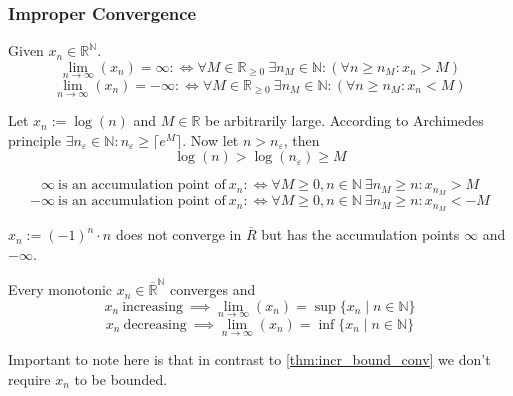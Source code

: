 \subsubsection{Improper Convergence}
\begin{definition}
   Given \(x_n \in \mathbb{R}^\mathbb{N}\).
   \[\lim_{n \to \infty}(x_n) = \infty :\iff \forall M \in \mathbb{R}_{\geq 0}~\exists n_M \in \mathbb{N}: (\forall n \geq n_M: x_n > M)\]
   \[\lim_{n \to \infty}(x_n) = -\infty :\iff \forall M \in \mathbb{R}_{\geq 0}~\exists n_M \in \mathbb{N}: (\forall n \geq n_M: x_n < M)\]
\end{definition}
\begin{example}
   Let \(x_n := \log(n)\) and \(M \in \mathbb{R}\) be arbitrarily large.
   According to Archimedes principle \(\exists n_\varepsilon \in \mathbb{N}: n_\varepsilon \geq \lceil e^M\rceil\).
   Now let \(n > n_\varepsilon\), then
   \[\log(n) > \log(n_\varepsilon) \geq M\]
\end{example}
\begin{remark}
   \[\infty~\text{is an accumulation point of}~x_n :\iff \forall M \geq 0, n \in \mathbb{N}~\exists n_M \geq n: x_{n_M} > M\]
   \[-\infty~\text{is an accumulation point of}~x_n :\iff \forall M \geq 0, n \in \mathbb{N}~\exists n_M \geq n: x_{n_M} < -M\]
\end{remark}
\begin{example}
   \(x_n := (-1)^n \cdot n\) does not converge in \(\overline{R}\) but has the accumulation points \(\infty\) and \(-\infty\).
\end{example}

\begin{theorem}\label{thm:improper_limits}
   Every monotonic \(x_n \in \overline{\mathbb{R}}^\mathbb{N}\) converges and
   \[x_n~\text{increasing}~\implies \lim_{n \to \infty}(x_n) = \sup\{x_n \mid n \in \mathbb{N}\}\]
   \[x_n~\text{decreasing}~\implies \lim_{n \to \infty}(x_n) = \inf\{x_n \mid n \in \mathbb{N}\}\]
\end{theorem}
\begin{remark}
   Important to note here is that in contrast to \cref{thm:incr_bound_conv} we don't require \(x_n\) to be bounded.
\end{remark}

